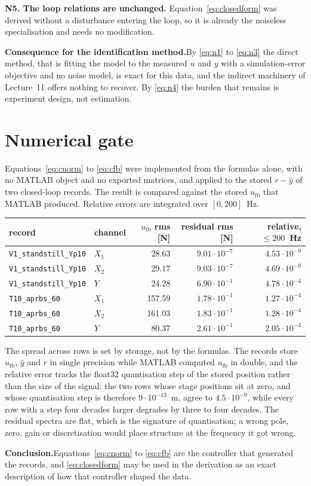 \documentclass[11pt]{article}
\newcommand{\yh}{\hat{y}}
\newcommand{\ufb}{u_{\mathrm{fb}}}
\begin{document}
\medskip\noindent\textbf{N5. The loop relations are unchanged.}\quad
Equation~\eqref{eq:closedform} was derived without a disturbance entering the loop, so it is
already the noiseless specialisation and needs no modification.

\medskip\noindent\textbf{Consequence for the identification method.}\quad By \eqref{eq:n1} to
\eqref{eq:n3} the direct method, that is fitting the model to the measured $u$ and $y$ with a
simulation-error objective and no noise model, is exact for this data, and the indirect machinery
of Lecture~11 offers nothing to recover. By \eqref{eq:n4} the burden that remains is experiment
design, not estimation.

\section{Numerical gate}
\label{sec:gate}

Equations~\eqref{eq:cnorm} to \eqref{eq:cfb} were implemented from the formulas alone, with no
MATLAB object and no exported matrices, and applied to the stored $r - \yh$ of two closed-loop
records. The result is compared against the stored $\ufb$ that MATLAB produced. Relative errors
are integrated over $[0,200]$~Hz.

\begin{center}
\begin{tabular}{llrrr}
\toprule
record & channel & $\ufb$ rms [N] & residual rms [N] & relative, $\le 200$~Hz \\
\midrule
\texttt{V1\_standstill\_Yp10} & $X_1$ & 28.63 & $9.01\cdot10^{-7}$ & $4.53\cdot10^{-9}$ \\
\texttt{V1\_standstill\_Yp10} & $X_2$ & 29.17 & $9.03\cdot10^{-7}$ & $4.69\cdot10^{-9}$ \\
\texttt{V1\_standstill\_Yp10} & $Y$   & 24.28 & $6.90\cdot10^{-1}$ & $4.78\cdot10^{-4}$ \\
\texttt{T10\_aprbs\_60}       & $X_1$ & 157.59 & $1.78\cdot10^{-1}$ & $1.27\cdot10^{-4}$ \\
\texttt{T10\_aprbs\_60}       & $X_2$ & 161.03 & $1.83\cdot10^{-1}$ & $1.28\cdot10^{-4}$ \\
\texttt{T10\_aprbs\_60}       & $Y$   & 80.37 & $2.61\cdot10^{-1}$ & $2.05\cdot10^{-4}$ \\
\bottomrule
\end{tabular}
\end{center}

\noindent The spread across rows is set by storage, not by the formulas. The records store
$\ufb$, $\yh$ and $r$ in single precision while MATLAB computed $\ufb$ in double, and the
relative error tracks the float32 quantisation step of the stored position rather than the size
of the signal: the two rows whose stage positions sit at zero, and whose quantisation step is
therefore $9\cdot10^{-13}$~m, agree to $4.5\cdot10^{-9}$, while every row with a step four
decades larger degrades by three to four decades. The residual spectra are flat, which is the
signature of quantisation; a wrong pole, zero, gain or discretisation would place structure at
the frequency it got wrong.

\medskip\noindent\textbf{Conclusion.}\quad Equations~\eqref{eq:cnorm} to \eqref{eq:cfb} are the
controller that generated the records, and \eqref{eq:closedform} may be used in the derivation
as an exact description of how that controller shaped the data.
\end{document}
